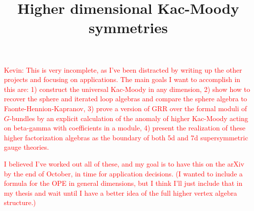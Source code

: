 \documentclass[10pt]{amsart}
\title{Higher dimensional Kac-Moody symmetries}
\begin{document}
\maketitle

%
\tableofcontents


\textcolor{red}{Kevin: This is very incomplete, as I've been distracted by writing up the other projects and focusing on applications. The main goals I want to accomplish in this are: 1) construct the universal Kac-Moody in any dimension, 2) show how to recover the sphere and iterated loop algebras and compare the sphere algebra to Faonte-Hennion-Kapranov, 3) prove a version of GRR over the formal moduli of $G$-bundles by an explicit calculation of the anomaly of higher Kac-Moody acting on beta-gamma with coefficients in a module, 4) present the realization of these higher factorization algebras as the boundary of both 5d and 7d supersymmetric gauge theories. }

\textcolor{red}{I believed I've worked out all of these, and my goal is to have this on the arXiv by the end of October, in time for application decisions.
(I wanted to include a formula for the OPE in general dimensions, but I think I'll just include that in my thesis and wait until I have a better idea of the full higher vertex algebra structure.)}








\end{document}

